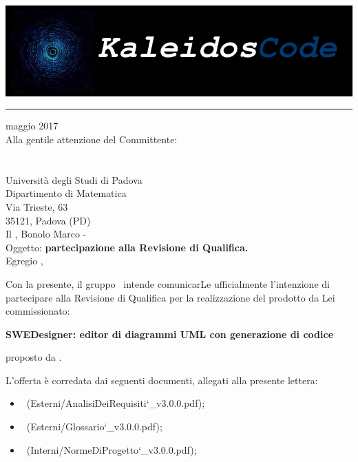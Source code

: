 \documentclass[a4paper,12pt]{article}
\author{KaleidosCode}
\date{23/05/2017}	%
\begin{document}
	\begin{titlepage}
		\includegraphics[scale=0.2]{../../../Immagini/KaleidosCodeLogo.png}
		\hrule
		\vspace{1.2cm}
		 maggio 2017\\
		\vspace{0.4cm}
		Alla gentile attenzione del Committente:\\
		\vardanega\\
		\cardin\\
		Università degli Studi di Padova\\
		Dipartimento di Matematica\\
		Via Trieste, 63\\
		35121, Padova (PD)\\
		\vspace{1.2cm}
		\flushleft Il \responsabilediprogetto, Bonolo Marco - \kaleidoscode\\
		\vspace{0.4cm}
		Oggetto: \textbf{partecipazione alla Revisione di Qualifica.}\\
		\vspace{1cm}
		Egregio \vardanega,\\
		\vspace{0.4cm}
		\par Con la presente, il gruppo \kaleidoscode\ intende comunicarLe ufficialmente l'intenzione di partecipare alla Revisione
		di Qualifica per la realizzazione del prodotto da Lei commissionato:
		\begin{center}
			\textbf{SWEDesigner: editor di diagrammi UML con generazione di codice} 
		\end{center}
		proposto da \proponente.
		\par L'offerta è corredata dai seguenti documenti, allegati alla presente lettera:
		\begin{itemize}
			\item \analisideirequisitiRQ\ (Esterni/AnalisiDeiRequisiti\char`_v3.0.0.pdf);
			\item \glossarioRQ\ (Esterni/Glossario\char`_v3.0.0.pdf);
			\item \normediprogettoRQ\ (Interni/NormeDiProgetto\char`_v3.0.0.pdf);

\end{itemize}
\end{titlepage}
\end{document}
